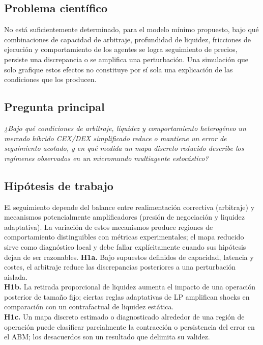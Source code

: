 \documentclass[11pt,a4paper]{article}
\begin{document}
\subsection{Problema científico}
No está suficientemente determinado, para el modelo mínimo propuesto, bajo qué combinaciones de capacidad de arbitraje, profundidad de liquidez, fricciones de ejecución y comportamiento de los agentes se logra seguimiento de precios, persiste una discrepancia o se amplifica una perturbación. Una simulación que solo grafique estos efectos no constituye por sí sola una explicación de las condiciones que los producen.
\subsection{Pregunta principal}
\emph{¿Bajo qué condiciones de arbitraje, liquidez y comportamiento heterogéneo un mercado híbrido CEX/DEX simplificado reduce o mantiene un error de seguimiento acotado, y en qué medida un mapa discreto reducido describe los regímenes observados en un micromundo multiagente estocástico?}
\subsection{Hipótesis de trabajo}
El seguimiento depende del balance entre realimentación correctiva (arbitraje) y mecanismos potencialmente amplificadores (presión de negociación y liquidez adaptativa). La variación de estos mecanismos produce regiones de comportamiento distinguibles con métricas experimentales; el mapa reducido sirve como diagnóstico local y debe fallar explícitamente cuando sus hipótesis dejan de ser razonables.
\textbf{H1a.} Bajo supuestos definidos de capacidad, latencia y costes, el arbitraje reduce las discrepancias posteriores a una perturbación aislada.\\
\textbf{H1b.} La retirada proporcional de liquidez aumenta el impacto de una operación posterior de tamaño fijo; ciertas reglas adaptativas de LP amplifican shocks en comparación con un contrafactual de liquidez estática.\\
\textbf{H1c.} Un mapa discreto estimado o diagnosticado alrededor de una región de operación puede clasificar parcialmente la contracción o persistencia del error en el ABM; los desacuerdos son un resultado que delimita su validez.
\end{document}
